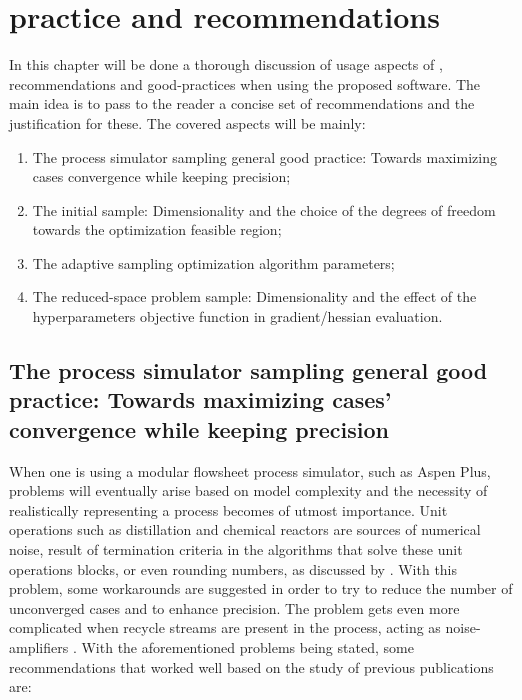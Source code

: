 \documentclass[../msc-thesis.tex]{subfiles}
\begin{document}
\chapter{\mtc practice and recommendations}
\label{section:discussion}

In this chapter will be done a thorough discussion of usage aspects of \mtc, 
recommendations and good-practices when using the proposed software. 
The main idea is to pass to the reader a concise set of recommendations and 
the justification for these. The covered aspects will be mainly:

\begin{enumerate}
    \item The process simulator sampling general good practice: Towards 
    maximizing cases convergence while keeping precision;

    \item The initial sample: Dimensionality and the choice of the degrees of 
    freedom towards the optimization feasible region;

    \item The adaptive sampling optimization algorithm parameters;

    \item The reduced-space problem sample: Dimensionality and the effect of 
    the \textcite{Lophaven2002} hyperparameters objective function in 
    gradient/hessian evaluation.
\end{enumerate}

\section{The process simulator sampling general good practice:  Towards 
maximizing cases’ convergence while keeping precision}

When one is using a modular flowsheet process simulator, such as Aspen Plus, 
problems will eventually arise based on model complexity and the necessity
of realistically representing a process becomes of utmost importance. Unit 
operations such as distillation and chemical reactors are sources of numerical 
noise, result of termination criteria in the algorithms that solve these unit 
operations blocks, or even rounding numbers, as discussed by 
\textcite{Caballero2008}. With this problem, some workarounds are suggested 
in order to try to reduce the number of unconverged cases and to enhance 
precision. The problem gets even more complicated when recycle streams are 
present in the process, acting as noise-amplifiers \cite{Quirante2016}. 
With the aforementioned problems being stated, some recommendations that 
worked well based on the study of previous publications are:
\end{document}
